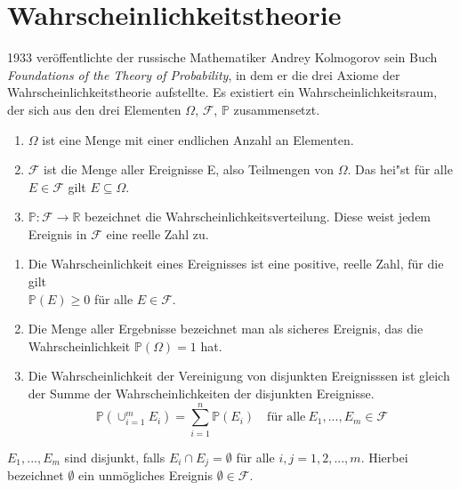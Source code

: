 \section{Wahrscheinlichkeitstheorie}
1933 ver\"offentlichte der russische Mathematiker Andrey Kolmogorov sein Buch \textit{Foundations of the Theory of Probability}, in dem er die drei Axiome der Wahrscheinlichkeitstheorie aufstellte. Es existiert ein Wahrscheinlichkeitsraum, der sich aus den drei Elementen $\Omega$, $\mathcal{F}$, $\mathbb{P}$ zusammensetzt.

\vspace{5pt}

\begin{enumerate}
	\item $\Omega$ ist eine Menge mit einer endlichen Anzahl an Elementen.
	\item $\mathcal{F}$ ist die Menge aller Ereignisse E, also Teilmengen von $\Omega$. Das hei"st f\"ur alle $E \in \mathcal{F}$ gilt $E \subseteq \Omega$.
	\item $\mathbb{P}: \mathcal{F} \rightarrow \mathbb{R}$ bezeichnet die Wahrscheinlichkeitsverteilung. Diese weist jedem Ereignis in $\mathcal{F}$ eine reelle Zahl zu.  
	
	
\end{enumerate}

\vspace{10pt}



\begin{Def}

\vspace{5pt}

\begin{enumerate}
	\item Die Wahrscheinlichkeit eines Ereignisses ist eine positive, reelle Zahl, f\"ur die gilt \\ $\mathbb{P} (E) \geq 0$ f\"ur alle $E \in \mathcal{F}$.
	\item Die Menge aller Ergebnisse bezeichnet man als sicheres Ereignis, das die Wahrscheinlichkeit $\mathbb{P} (\Omega) = 1$ hat.
	\item Die Wahrscheinlichkeit der Vereinigung von disjunkten Ereignisssen ist gleich der Summe der Wahrscheinlichkeiten der disjunkten Ereignisse. 
	\vspace{3pt}
	\begin{equation*}
	\mathbb{P} (\cup_{i=1}^m E_{i}) = \sum_{i=1}^n \mathbb{P} (E_{i}) \quad \text{f\"ur alle} \: E_{1},...,E_{m} \in \mathcal{F}
	\end{equation*}
\end{enumerate}
\vspace{5pt}

$E_{1},...,E_{m}$ sind disjunkt, falls $E_{i} \cap E_{j} = \emptyset$ f\"ur alle $i,j= 1,2,...,m$. 
Hierbei bezeichnet $\emptyset$ ein unm\"ogliches Ereignis $\emptyset \in \mathcal{F}$.
\end{Def}

